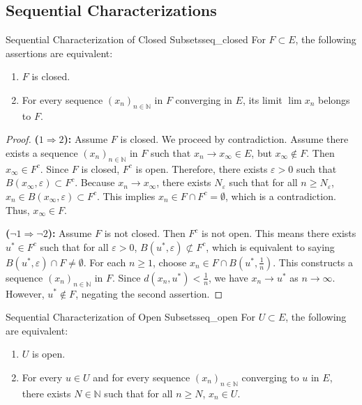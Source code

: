\documentclass[11pt, a4paper]{article}
\newcommand{\N}{\mathbb{N}}
\newcommand{\eps}{\varepsilon}
\begin{document}
\subsection{Sequential Characterizations}
\begin{theorem}{Sequential Characterization of Closed Subsets}{seq_closed}
For $F \subset E$, the following assertions are equivalent:
\begin{enumerate}
    \item $F$ is closed.
    \item For every sequence $(x_n)_{n \in \N}$ in $F$ converging in $E$, its limit $\lim x_n$ belongs to $F$.
\end{enumerate}
\end{theorem}
\begin{proof}
\textbf{($1 \Rightarrow 2$):} Assume $F$ is closed. We proceed by contradiction. Assume there exists a sequence $(x_n)_{n \in \N}$ in $F$ such that $x_n \to x_\infty \in E$, but $x_\infty \notin F$. Then $x_\infty \in F^c$.
Since $F$ is closed, $F^c$ is open. Therefore, there exists $\eps > 0$ such that $B(x_\infty, \eps) \subset F^c$.
Because $x_n \to x_\infty$, there exists $N_\eps$ such that for all $n \ge N_\eps$, $x_n \in B(x_\infty, \eps) \subset F^c$.
This implies $x_n \in F \cap F^c = \emptyset$, which is a contradiction. Thus, $x_\infty \in F$.

\textbf{($\neg 1 \Rightarrow \neg 2$):} Assume $F$ is not closed. Then $F^c$ is not open.
This means there exists $u^* \in F^c$ such that for all $\eps > 0$, $B(u^*, \eps) \not\subset F^c$, which is equivalent to saying $B(u^*, \eps) \cap F \neq \emptyset$.
For each $n \ge 1$, choose $x_n \in F \cap B(u^*, \frac{1}{n})$. This constructs a sequence $(x_n)_{n \in \N}$ in $F$.
Since $d(x_n, u^*) < \frac{1}{n}$, we have $x_n \to u^*$ as $n \to \infty$. However, $u^* \notin F$, negating the second assertion.
\end{proof}

\begin{theorem}{Sequential Characterization of Open Subsets}{seq_open}
For $U \subset E$, the following are equivalent:
\begin{enumerate}
    \item $U$ is open.
    \item For every $u \in U$ and for every sequence $(x_n)_{n \in \N}$ converging to $u$ in $E$, there exists $N \in \N$ such that for all $n \ge N$, $x_n \in U$.
\end{enumerate}
\end{theorem}
\end{document}
